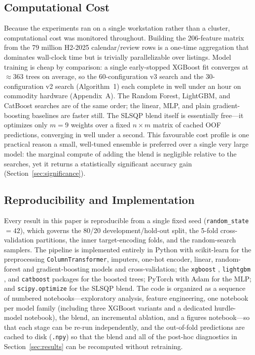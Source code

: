 \documentclass[journal]{IEEEtran}
\begin{document}
\subsection{Computational Cost}
\label{sec:cost}
Because the experiments ran on a single workstation rather than a cluster,
computational cost was monitored throughout. Building the 206-feature matrix
from the 79 million H2-2025 calendar/review rows is a one-time aggregation
that dominates wall-clock time but is trivially parallelizable over listings.
Model training is cheap by comparison: a single early-stopped XGBoost fit
converges at $\approx$363 trees on average, so the 60-configuration v3 search
and the 30-configuration v2 search (Algorithm~1) each complete in well under an
hour on commodity hardware (Appendix~A). The Random Forest, LightGBM, and
CatBoost searches are of the same order; the linear, MLP, and plain
gradient-boosting baselines are faster still. The SLSQP blend itself is
essentially free---it optimizes only $m=9$ weights over a fixed $n\times m$
matrix of cached OOF predictions, converging in well under a second. This
favourable cost profile is one practical reason a small, well-tuned ensemble is
preferred over a single very large model: the marginal compute of adding the
blend is negligible relative to the searches, yet it returns a statistically
significant accuracy gain (Section~\ref{sec:significance}).

\subsection{Reproducibility and Implementation}
\label{sec:repro}
Every result in this paper is reproducible from a single fixed seed
(\texttt{random\_state}~$=42$), which governs the 80/20 development/hold-out
split, the 5-fold cross-validation partitions, the inner target-encoding folds,
and the random-search samplers. The pipeline is implemented entirely in Python
with scikit-learn \cite{pedregosa2011sklearn} for the preprocessing
\texttt{ColumnTransformer}, imputers, one-hot encoder, linear, random-forest and
gradient-boosting models and cross-validation; the \texttt{xgboost}
\cite{chen2016xgboost}, \texttt{lightgbm} \cite{ke2017lightgbm}, and
\texttt{catboost} \cite{prokhorenkova2018catboost} packages for the boosted
trees; PyTorch \cite{paszke2019pytorch} with Adam \cite{kingma2015adam} for the
MLP; and \texttt{scipy.optimize} for the SLSQP blend. The code is organized as
a sequence of numbered notebooks---exploratory analysis, feature engineering,
one notebook per model family (including three XGBoost variants and a
dedicated hurdle-model notebook), the blend, an incremental ablation, and a
figures notebook---so that each stage can be re-run independently, and the
out-of-fold predictions are cached to disk (\texttt{.npy}) so that the blend
and all of the post-hoc diagnostics in Section~\ref{sec:results} can be
recomputed without retraining.
\end{document}
